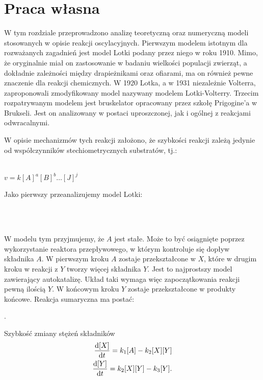 \documentclass[10pt, a4paper, twoside, onecolumn]{article}
\numberwithin{equation}{section}
\begin{document}
	\section{Praca własna}
	W tym rozdziale przeprowadzono analizę teoretyczną oraz numeryczną modeli stosowanych w opisie reakcji oscylacyjnych. Pierwszym modelem istotnym dla rozważanych zagadnień jest model Lotki podany przez niego w roku 1910. Mimo, że oryginalnie miał on zastosowanie w badaniu wielkości populacji zwierząt, a dokładnie zależności między drapieżnikami oraz ofiarami, ma on również pewne znaczenie dla reakcji chemicznych. W 1920 Lotka, a w 1931 niezależnie Volterra, zaproponowali zmodyfikowany model nazywany modelem Lotki-Volterry. Trzecim rozpatrywanym modelem jest bruskelator opracowany przez szkołę Prigogine'a w Brukseli. Jest on analizowany w postaci uproszczonej, jak i ogólnej z reakcjami odwracalnymi. \par
	W opisie mechanizmów tych reakcji założono, że szybkości reakcji zależą jedynie od współczynników stechiometrycznych substratów, tj.:
	\begin{center}
		 \\
		\(v = k[A]^{a}[B]^{b}\ldots[J]^{j}\)
	\end{center}
	Jako pierwszy przeanalizujemy model Lotki: 
	\begin{center}
		 \\
		 \\
	\end{center}
	W modelu tym przyjmujemy, że \(A\) jest stałe. Może to być osiągnięte poprzez wykorzystanie reaktora przepływowego, w którym kontroluje się dopływ składnika \(A\). W pierwszym kroku \(A\) zostaje przekształcone w \(X\), które w drugim kroku w reakcji z \(Y\) tworzy więcej składnika \(Y\). Jest to najprostszy model zawierający autokatalizę. Układ taki wymaga więc zapoczątkowania reakcji pewną ilością \(Y\). W końcowym kroku \(Y\) zostaje przekształcone w produkty końcowe. Reakcja sumaryczna ma postać:
	\begin{center}
		.
	\end{center}
	Szybkość zmiany stężeń składników 
	\begin{equation}
	\begin{split}
		\dv{[X]}{t}=k_{1}[A]-k_{2}[X][Y] \\
		\dv{[Y]}{t}=k_{2}[X][Y]-k_{3}[Y].
	\end{split}
	\end{equation}
\end{document}
